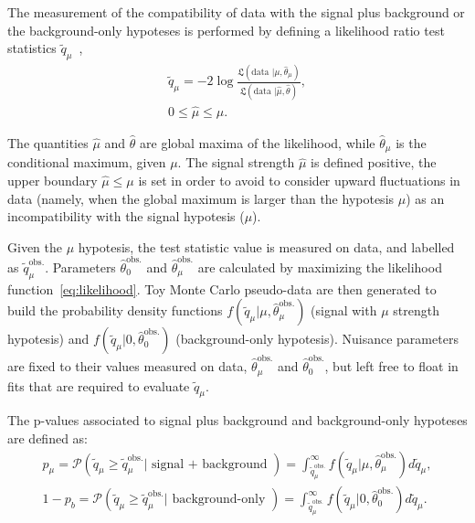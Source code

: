 \noindent The measurement of the compatibility of data with the signal plus background or the background-only hypoteses is performed by defining a likelihood ratio test statistics $\tilde{q}_{\mu}$~\cite{bib:Asymptotic},
\begin{equation}
\begin{gathered}
\tilde{q}_{\mu} = -2 \log { \frac{\mathfrak{L} (\text{data }| \mu, \hat{\theta}_{\mu}) }{ \mathfrak{L} (\text{data }| \hat{\mu}, \hat{\theta})  } },\\
0 \leq \hat{\mu} \leq \mu.
\end{gathered}
\end{equation}

\noindent The quantities $\hat{\mu}$ and $\hat{\theta}$ are global maxima of the likelihood, while $\hat{\theta}_{\mu}$ is the conditional maximum, given $\mu$. The signal strength $\hat{\mu}$ is defined positive, the upper boundary $\hat{\mu} \leq \mu$ is set in order to avoid to consider upward fluctuations in data (namely, when the global maximum is larger than the hypotesis $\mu$) as an incompatibility with the signal hypotesis ($\mu$).

\noindent Given the $\mu$ hypotesis, the test statistic value is measured on data, and labelled as $\tilde{q}_{\mu}^{\text{obs.}}$. Parameters $\hat{\theta}_0^{\text{obs.}}$ and $\hat{\theta}_{\mu}^{\text{obs.}}$ are calculated by maximizing the likelihood function~\ref{eq:likelihood}. Toy Monte Carlo pseudo-data are then generated to build the probability density functions $f(\tilde{q}_{\mu}|\mu, \hat{\theta}_{\mu}^{\text{obs.}})$ (signal with $\mu$ strength hypotesis) and $f(\tilde{q}_{\mu}|0, \hat{\theta}_0^{\text{obs.}})$ (background-only hypotesis). Nuisance parameters are fixed to their values measured on data, $\hat{\theta}_{\mu}^{\text{obs.}}$ and $\hat{\theta}_0^{\text{obs.}}$, but left free to float in fits that are required to evaluate $\tilde{q}_{\mu}$.

\noindent The p-values associated to signal plus background and background-only hypoteses are defined as:
\begin{equation}
\begin{gathered}
p_{\mu} = \mathcal{P} \left( \tilde{q}_{\mu} \geq \tilde{q}_{\mu}^{\text{obs.}} | \text{ signal + background } \right) = \int_{\tilde{q}_{\mu}^{\text{obs.}}}^{\infty} f(\tilde{q}_{\mu}|\mu, \hat{\theta}_{\mu}^{\text{obs.}}) d \tilde{q}_{\mu} ,\\
1 - p_b = \mathcal{P} \left( \tilde{q}_{\mu} \geq \tilde{q}_{\mu}^{\text{obs.}} | \text{ background-only } \right) = \int_{\tilde{q}_{\mu}^{\text{obs.}}}^{\infty} f(\tilde{q}_{\mu}|0, \hat{\theta}_{0}^{\text{obs.}}) d \tilde{q}_{\mu} .\\
\end{gathered}
\end{equation}

